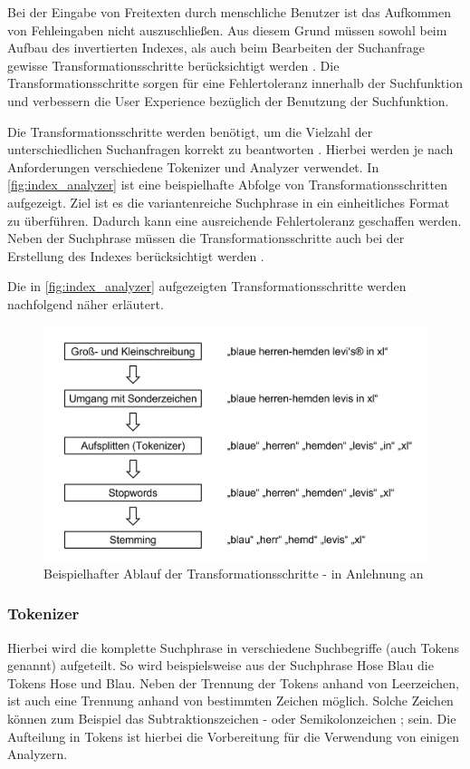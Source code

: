 Bei der Eingabe von Freitexten durch menschliche Benutzer ist das Aufkommen von Fehleingaben nicht auszuschließen. Aus diesem Grund müssen sowohl beim Aufbau des invertierten Indexes, als auch beim Bearbeiten der Suchanfrage gewisse Transformationsschritte berücksichtigt werden \cite{SebastianRuss.2017}. Die Transformationsschritte sorgen für eine Fehlertoleranz innerhalb der Suchfunktion und verbessern die User Experience bezüglich der Benutzung der Suchfunktion.

Die Transformationsschritte werden benötigt, um die Vielzahl der unterschiedlichen Suchanfragen korrekt zu beantworten \cite{SebastianRuss.2017}. Hierbei werden je nach Anforderungen verschiedene Tokenizer und Analyzer verwendet. In \autoref{fig:index_analyzer} ist eine beispielhafte Abfolge von Transformationsschritten aufgezeigt. Ziel ist es die variantenreiche Suchphrase in ein einheitliches Format zu überführen. Dadurch kann eine ausreichende Fehlertoleranz geschaffen werden. Neben der Suchphrase müssen die Transformationsschritte auch bei der Erstellung des Indexes berücksichtigt werden \cite{SebastianRuss.2017}.

Die in \autoref{fig:index_analyzer} aufgezeigten Transformationsschritte werden nachfolgend näher erläutert.

\begin{figure}[H]
    \centering
    \includegraphics[width=0.65\linewidth]{images/Index_Analyzer.png}
    \caption{Beispielhafter Ablauf der Transformationsschritte - in Anlehnung an \cite{SebastianRuss.2017}}
    \label{fig:index_analyzer}
\end{figure}

\subsubsection{Tokenizer}

Hierbei wird die komplette Suchphrase in verschiedene Suchbegriffe (auch Tokens genannt) aufgeteilt. So wird beispielsweise aus der Suchphrase \glqq Hose Blau\grqq{} die Tokens \glqq Hose\grqq{} und \glqq Blau\grqq{}. Neben der Trennung der Tokens anhand von Leerzeichen, ist auch eine Trennung anhand von bestimmten Zeichen möglich. Solche Zeichen können zum Beispiel das Subtraktionszeichen \glqq -\grqq{} oder Semikolonzeichen \glqq ;\grqq{} sein. Die Aufteilung in Tokens ist hierbei die Vorbereitung für die Verwendung von einigen Analyzern.


